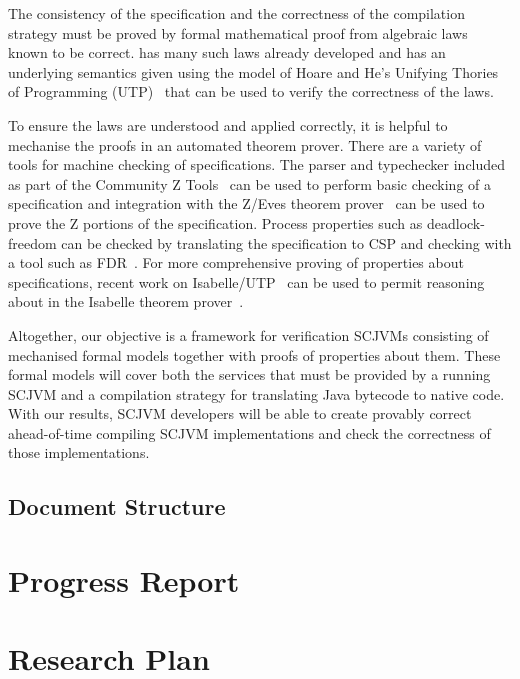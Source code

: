 \documentclass[a4paper,10pt]{report}
\begin{document}
The consistency of the specification and the correctness of the
compilation strategy must be proved by formal mathematical proof from
algebraic laws known to be correct.
\Circus{} has many such laws already developed and has an underlying
semantics given using the model of Hoare and He's Unifying Thories of
Programming (UTP)~\cite{hoare1998} that can be used to verify the
correctness of the laws.

To ensure the laws are understood and applied correctly, it is helpful
to mechanise the proofs in an automated theorem prover.
There are a variety of tools for machine checking of \Circus{}
specifications.
The \Circus{} parser and typechecker included as part of the Community
Z Tools~\cite{malik2011, xavier2008, malik2005, miller2005} can be
used to perform basic checking of a \Circus{} specification and
integration with the Z/Eves theorem prover~\cite{saaltink1997} can be
used to prove the Z portions of the \Circus{} specification.
Process properties such as deadlock-freedom can be checked by
translating the \Circus{} specification to CSP and checking with a
tool such as FDR~\cite{gibson-robinson2014}.
For more comprehensive proving of properties about \Circus{}
specifications, recent work on Isabelle/UTP~\cite{foster2015} can be
used to permit reasoning about \Circus{} in the Isabelle theorem
prover~\cite{nipkow2002}.

Altogether, our objective is a framework for verification SCJVMs
consisting of mechanised formal models together with proofs of
properties about them.
These formal models will cover both the services that must be provided
by a running SCJVM and a compilation strategy for translating Java
bytecode to native code.
With our results, SCJVM developers will be able to create provably
correct ahead-of-time compiling SCJVM implementations and check the
correctness of those implementations.


\section{Document Structure}

\chapter{Progress Report}

\chapter{Research Plan}
\end{document}
